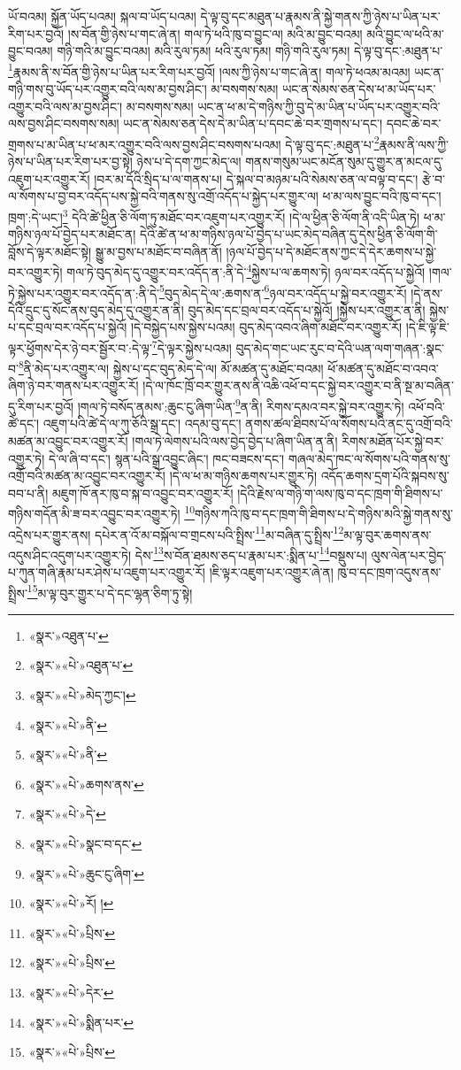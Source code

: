 ཡོ་བའམ། སྐྱོན་ཡོད་པའམ། སྐལ་བ་ཡོད་པའམ། དེ་ལྟ་བུ་དང་མཐུན་པ་རྣམས་ནི་སྐྱེ་གནས་ཀྱི་ཉེས་པ་ཡིན་པར་རིག་པར་བྱའོ། །ས་བོན་གྱི་ཉེས་པ་གང་ཞེ་ན། གལ་ཏེ་ཕའི་ཁུ་བ་བྱུང་ལ། མའི་མ་བྱུང་བའམ། མའི་བྱུང་ལ་ཕའི་མ་བྱུང་བའམ། གཉི་གའི་མ་བྱུང་བའམ། མའི་རུལ་ཏམ། ཕའི་རུལ་ཏམ། གཉི་གའི་རུལ་ཏམ། དེ་ལྟ་བུ་དང་:མཐུན་པ་\footnote{«སྣར་»འཐུན་པ་}རྣམས་ནི་ས་བོན་གྱི་ཉེས་པ་ཡིན་པར་རིག་པར་བྱའོ། །ལས་ཀྱི་ཉེས་པ་གང་ཞེ་ན། གལ་ཏེ་ཕའམ་མའམ། ཡང་ན་གཉི་གས་བུ་ཡོད་པར་འགྱུར་བའི་ལས་མ་བྱས་ཤིང་། མ་བསགས་སམ། ཡང་ན་སེམས་ཅན་དེས་ཕ་མ་ཡོད་པར་འགྱུར་བའི་ལས་མ་བྱས་ཤིང་། མ་བསགས་སམ། ཡང་ན་ཕ་མ་དེ་གཉིས་ཀྱི་བུ་དེ་མ་ཡིན་པ་ཡོད་པར་འགྱུར་བའི་ལས་བྱས་ཤིང་བསགས་སམ། ཡང་ན་སེམས་ཅན་དེས་དེ་མ་ཡིན་པ་དབང་ཆེ་བར་གྲགས་པ་དང་། དབང་ཆེ་བར་གྲགས་པ་མ་ཡིན་པ་ཕ་མར་འགྱུར་བའི་ལས་བྱས་ཤིང་བསགས་པའམ། དེ་ལྟ་བུ་དང་:མཐུན་པ་\footnote{«སྣར་»«པེ་»འཐུན་པ་}རྣམས་ནི་ལས་ཀྱི་ཉེས་པ་ཡིན་པར་རིག་པར་བྱ་སྟེ། ཉེས་པ་དེ་དག་ཀྱང་མེད་ལ། གནས་གསུམ་ཡང་མངོན་སུམ་དུ་གྱུར་ན་མངལ་དུ་འཇུག་པར་འགྱུར་རོ། །བར་མ་དོའི་སྲིད་པ་ལ་གནས་པ། དེ་སྐལ་བ་མཉམ་པའི་སེམས་ཅན་ལ་བལྟ་བ་དང་། རྩེ་བ་ལ་སོགས་པ་བྱ་བར་འདོད་པས་སྐྱེ་བའི་གནས་སུ་འགྲོ་འདོད་པ་སྐྱེད་པར་གྱུར་ལ། ཕ་མ་ལས་བྱུང་བའི་ཁུ་བ་དང་། ཁྲག་:དེ་ཡང་།\footnote{«སྣར་»«པེ་»མེད་ཀྱང་།} དེའི་ཚེ་ཕྱིན་ཅི་ལོག་ཏུ་མཐོང་བར་འཇུག་པར་འགྱུར་རོ། །དེ་ལ་ཕྱིན་ཅི་ལོག་ནི་འདི་ཡིན་ཏེ། ཕ་མ་གཉིས་ཉལ་པོ་བྱེད་པར་མཐོང་ན། དེའི་ཚེ་ན་ཕ་མ་གཉིས་ཉལ་པོ་བྱེད་པ་ཡང་མེད་བཞིན་དུ་དེས་ཕྱིན་ཅི་ལོག་གི་བློས་དེ་ལྟར་མཐོང་སྟེ། སྒྱུ་མ་བྱས་པ་མཐོང་བ་བཞིན་ནོ། །ཉལ་པོ་བྱེད་པ་དེ་མཐོང་ནས་ཀྱང་དེ་དེར་ཆགས་པ་སྐྱེ་བར་འགྱུར་ཏེ། གལ་ཏེ་བུད་མེད་དུ་འགྱུར་བར་འདོད་ན་:ནི་དེ་\footnote{«སྣར་»«པེ་»ནི་}སྐྱེས་པ་ལ་ཆགས་ཏེ། ཉལ་བར་འདོད་པ་སྐྱེའོ། །གལ་ཏེ་སྐྱེས་པར་འགྱུར་བར་འདོད་ན་:ནི་དེ་\footnote{«སྣར་»«པེ་»ནི་}བུད་མེད་དེ་ལ་:ཆགས་ན་\footnote{«སྣར་»«པེ་»ཆགས་ནས་}ཉལ་བར་འདོད་པ་སྐྱེ་བར་འགྱུར་རོ། །དེ་ནས་དེའི་དྲུང་དུ་སོང་ནས་བུད་མེད་དུ་འགྱུར་ན་ནི། བུད་མེད་དང་བྲལ་བར་འདོད་པ་སྐྱེའོ། །སྐྱེས་པར་འགྱུར་ན་ནི། སྐྱེས་པ་དང་བྲལ་བར་འདོད་པ་སྐྱེའོ། །དེ་བསྐྱེད་པས་སྐྱེས་པའམ། བུད་མེད་འབའ་ཞིག་མཐོང་བར་འགྱུར་རོ། །དེ་ཇི་ལྟ་ཇི་ལྟར་ཕྱོགས་དེར་ཉེ་བར་སྦྱོར་བ་:དེ་ལྟ་\footnote{«སྣར་»«པེ་»དེ་}དེ་ལྟར་སྐྱེས་པའམ། བུད་མེད་གང་ཡང་རུང་བ་དེའི་ཡན་ལག་གཞན་:སྣང་བ་\footnote{«སྣར་»«པེ་»སྣང་བ་དང་}ནི་མེད་པར་འགྱུར་ལ། སྐྱེས་པ་དང་བུད་མེད་དེ་ལ། མོ་མཚན་དུ་མཐོང་བའམ། ཕོ་མཚན་དུ་མཐོང་བ་འབའ་ཞིག་ཉེ་བར་གནས་པར་འགྱུར་རོ། །དེ་ལ་ཁོང་ཁྲོ་བར་གྱུར་ནས་ནི་འཆི་འཕོ་བ་དང་སྐྱེ་བར་འགྱུར་བ་ནི་སྔ་མ་བཞིན་དུ་རིག་པར་བྱའོ། །གལ་ཏེ་བསོད་ནམས་:ཆུང་ངུ་ཞིག་ཡིན་\footnote{«སྣར་»«པེ་»ཆུང་ངུ་ཞིག་}ན་ནི། རིགས་དམའ་བར་སྐྱེ་བར་འགྱུར་ཏེ། འཕོ་བའི་ཚེ་དང་། འཇུག་པའི་ཚེ་དེ་ལ་ཀུ་ཅོའི་སྒྲ་དང་། འདམ་བུ་དང་། ནགས་ཚལ་ཐིབས་པོ་ལ་སོགས་པའི་ནང་དུ་འགྲོ་བའི་མཚན་མ་འབྱུང་བར་འགྱུར་རོ། །གལ་ཏེ་ལེགས་པའི་ལས་བྱེད་བྱེད་པ་ཞིག་ཡིན་ན་ནི། རིགས་མཐོན་པོར་སྐྱེ་བར་འགྱུར་ཏེ། དེ་ལ་ཞི་བ་དང་། སྙན་པའི་སྒྲ་འབྱུང་ཞིང་། ཁང་བཟངས་དང་། གཞལ་མེད་ཁང་ལ་སོགས་པའི་གནས་སུ་འགྲོ་བའི་མཚན་མ་འབྱུང་བར་འགྱུར་རོ། །དེ་ལ་ཕ་མ་གཉིས་ཆགས་པར་གྱུར་ཏེ། འདོད་ཆགས་དྲག་པོའི་སྐབས་སུ་བབ་པ་ནི། མཇུག་ཁོ་ནར་ཁུ་བ་སྐ་བ་འབྱུང་བར་འགྱུར་རོ། །དེའི་རྗེས་ལ་གཉི་ག་ལས་ཁུ་བ་དང་ཁྲག་གི་ཐིགས་པ་གཉིས་གདོན་མི་ཟ་བར་འབྱུང་བར་འགྱུར་ཏེ། \footnote{«སྣར་»«པེ་»རོ། ། }གཉིས་ཀའི་ཁུ་བ་དང་ཁྲག་གི་ཐིགས་པ་དེ་གཉིས་མའི་སྐྱེ་གནས་སུ་འདྲེས་པར་གྱུར་ནས། དཔེར་ན་འོ་མ་བསྐོལ་བ་གྲངས་པའི་སྤྲིས་\footnote{«སྣར་»«པེ་»པྲིས་}མ་བཞིན་དུ་སྤྲིས་\footnote{«སྣར་»«པེ་»པྲིས་}མ་ལྟ་བུར་ཆགས་ནས་འདུས་ཤིང་འདུག་པར་འགྱུར་ཏེ། དེས་\footnote{«སྣར་»«པེ་»དེར་}ས་བོན་ཐམས་ཅད་པ་རྣམ་པར་:སྨིན་པ་\footnote{«སྣར་»«པེ་»སྨིན་པར་}བསྡུས་པ། ལུས་ལེན་པར་བྱེད་པ་ཀུན་གཞི་རྣམ་པར་ཤེས་པ་འཇུག་པར་འགྱུར་རོ། །ཇི་ལྟར་འཇུག་པར་འགྱུར་ཞེ་ན། ཁུ་བ་དང་ཁྲག་འདུས་ནས་སྤྲིས་\footnote{«སྣར་»«པེ་»པྲིས་}མ་ལྟ་བུར་གྱུར་པ་དེ་དང་ལྷན་ཅིག་ཏུ་སྟེ། 